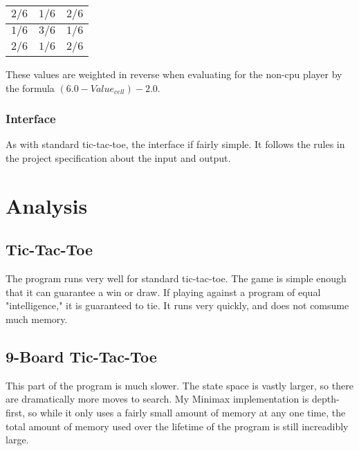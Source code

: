 \documentclass{article}
\begin{document}
\begin{center}
\begin{tabular}{c|c|c}
$2/6$ & $1/6$ & $2/6$\\\hline
$1/6$ & $3/6$ & $1/6$\\\hline
$2/6$ & $1/6$ & $2/6$\\
\end{tabular}
\end{center}


These values are weighted in reverse when evaluating for the non-cpu player by the formula $(6.0-Value_{cell})-2.0$.

\subsubsection{Interface}

As with standard tic-tac-toe, the interface if fairly simple. It follows the rules in the project specification about the input and output.

\section{Analysis}

\subsection{Tic-Tac-Toe}
The program runs very well for standard tic-tac-toe. The game is simple enough that it can guarantee a win or draw. If playing against a program of equal "intelligence," it is guaranteed to tie.
It runs very quickly, and does not comsume much memory.

\subsection{9-Board Tic-Tac-Toe}
This part of the program is much slower. The state space is vastly larger, so there are dramatically more moves to search. My Minimax implementation is depth-first, so while it only uses a fairly small
amount of memory at any one time, the total amount of memory used over the lifetime of the program is still increadibly large.
\end{document}
